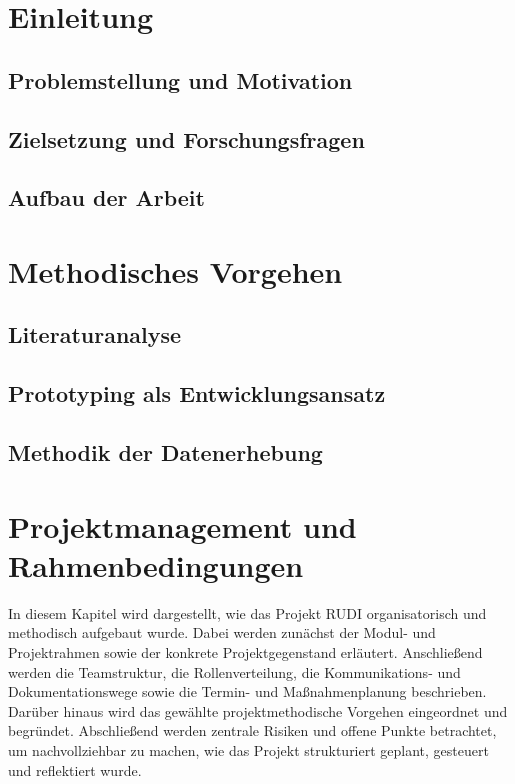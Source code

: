 \documentclass[12pt]{article}
\begin{document}
\newpage
{}
\setcounter{page}{1}

\newpage
\section{Einleitung}
\subsection{Problemstellung und Motivation}
\subsection{Zielsetzung und Forschungsfragen}
\subsection{Aufbau der Arbeit}
\section{Methodisches Vorgehen}
\subsection{Literaturanalyse}
\subsection{Prototyping als Entwicklungsansatz}
\subsection{Methodik der Datenerhebung}
\section{Projektmanagement und Rahmenbedingungen}
In diesem Kapitel wird dargestellt, wie das Projekt RUDI organisatorisch und methodisch aufgebaut wurde. Dabei werden zunächst der Modul- und Projektrahmen sowie der konkrete Projektgegenstand erläutert. Anschließend werden die Teamstruktur, die Rollenverteilung, die Kommunikations- und Dokumentationswege sowie die Termin- und Maßnahmenplanung beschrieben. Darüber hinaus wird das gewählte projektmethodische Vorgehen eingeordnet und begründet. Abschließend werden zentrale Risiken und offene Punkte betrachtet, um nachvollziehbar zu machen, wie das Projekt strukturiert geplant, gesteuert und reflektiert wurde.
\end{document}
